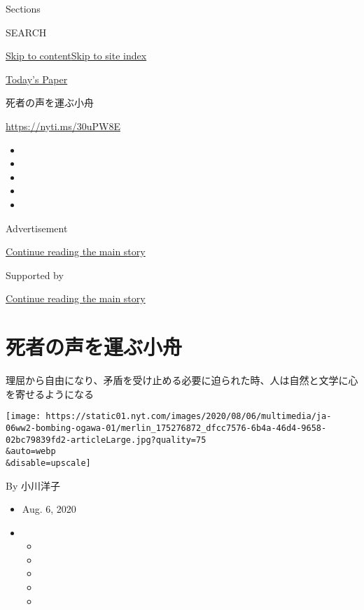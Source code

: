 Sections

SEARCH

\protect\hyperlink{site-content}{Skip to
content}\protect\hyperlink{site-index}{Skip to site index}

\href{https://myaccount.nytimes.com/auth/login?response_type=cookie\&client_id=vi}{}

\href{https://www.nytimes.com/section/todayspaper}{Today's Paper}

死者の声を運ぶ小舟

\href{https://nyti.ms/30uPW8E}{https://nyti.ms/30uPW8E}

\begin{itemize}
\item
\item
\item
\item
\item
\end{itemize}

Advertisement

\protect\hyperlink{after-top}{Continue reading the main story}

Supported by

\protect\hyperlink{after-sponsor}{Continue reading the main story}

\hypertarget{ux6b7bux8005ux306eux58f0ux3092ux904bux3076ux5c0fux821f}{%
\section{死者の声を運ぶ小舟}\label{ux6b7bux8005ux306eux58f0ux3092ux904bux3076ux5c0fux821f}}

理屈から自由になり、矛盾を受け止める必要に迫られた時、人は自然と文学に心を寄せるようになる

\texttt{[image: https://static01.nyt.com/images/2020/08/06/multimedia/ja-06ww2-bombing-ogawa-01/merlin\_175276872\_dfcc7576-6b4a-46d4-9658-02bc79839fd2-articleLarge.jpg?quality=75\\\&auto=webp\\\&disable=upscale]}

By 小川洋子

\begin{itemize}
\item
  Aug. 6, 2020
\item
  \begin{itemize}
  \item
  \item
  \item
  \item
  \item
  \end{itemize}
\end{itemize}

